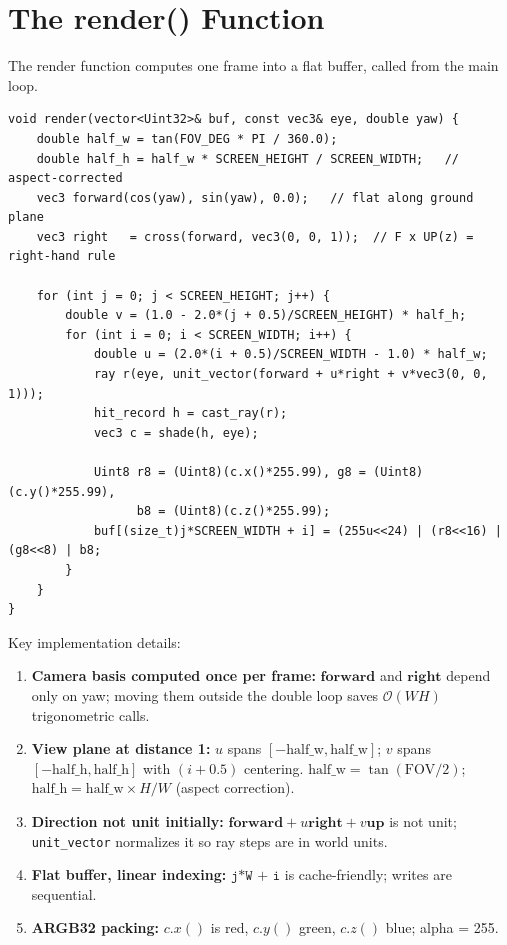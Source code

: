 \section{The render() Function}

The render function computes one frame into a flat buffer, called from the main loop.
\begin{verbatim}
void render(vector<Uint32>& buf, const vec3& eye, double yaw) {
    double half_w = tan(FOV_DEG * PI / 360.0);
    double half_h = half_w * SCREEN_HEIGHT / SCREEN_WIDTH;   // aspect-corrected
    vec3 forward(cos(yaw), sin(yaw), 0.0);   // flat along ground plane
    vec3 right   = cross(forward, vec3(0, 0, 1));  // F x UP(z) = right-hand rule

    for (int j = 0; j < SCREEN_HEIGHT; j++) {
        double v = (1.0 - 2.0*(j + 0.5)/SCREEN_HEIGHT) * half_h;
        for (int i = 0; i < SCREEN_WIDTH; i++) {
            double u = (2.0*(i + 0.5)/SCREEN_WIDTH - 1.0) * half_w;
            ray r(eye, unit_vector(forward + u*right + v*vec3(0, 0, 1)));
            hit_record h = cast_ray(r);
            vec3 c = shade(h, eye);

            Uint8 r8 = (Uint8)(c.x()*255.99), g8 = (Uint8)(c.y()*255.99),
                  b8 = (Uint8)(c.z()*255.99);
            buf[(size_t)j*SCREEN_WIDTH + i] = (255u<<24) | (r8<<16) | (g8<<8) | b8;
        }
    }
}
\end{verbatim}
Key implementation details:
\begin{enumerate}
    \item \textbf{Camera basis computed once per frame:} $\mathbf{forward}$ and $\mathbf{right}$ depend only on yaw; moving them outside the double loop saves $\mathcal{O}(W\!H)$ trigonometric calls.
    \item \textbf{View plane at distance 1:} $u$ spans $[-\text{half\_w}, \text{half\_w}]$; $v$ spans $[-\text{half\_h}, \text{half\_h}]$ with $(i+0.5)$ centering. $\text{half\_w} = \tan(\text{FOV}/2)$; $\text{half\_h} = \text{half\_w} \times H / W$ (aspect correction).
    \item \textbf{Direction not unit initially:} $\mathbf{forward} + u\mathbf{right} + v\mathbf{up}$ is not unit; \texttt{unit\_vector} normalizes it so ray steps are in world units.
    \item \textbf{Flat buffer, linear indexing:} $\texttt{j*W + i}$ is cache-friendly; writes are sequential.
    \item \textbf{ARGB32 packing:} $c.x()$ is red, $c.y()$ green, $c.z()$ blue; alpha = 255.
\end{enumerate}

